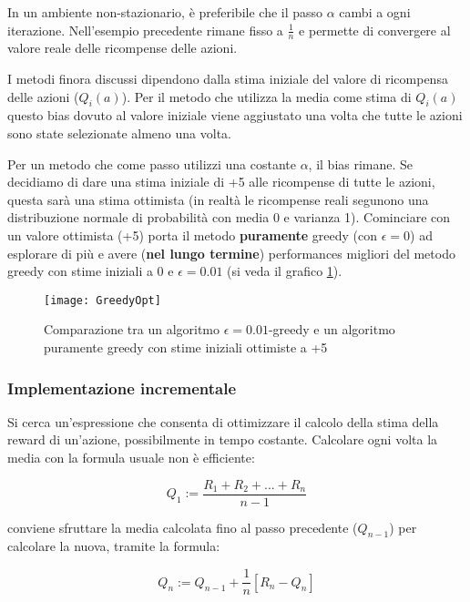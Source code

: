In un ambiente non-stazionario, è preferibile che il passo $\alpha$ cambi a ogni
iterazione. Nell'esempio precedente rimane fisso a $\frac{1}{n}$ e permette di convergere
al valore reale delle ricompense delle azioni.

I metodi finora discussi dipendono dalla stima iniziale del valore di
ricompensa delle azioni ($Q_i(a)$).
Per il metodo che utilizza la media come stima di $Q_i(a)$ questo bias
dovuto al valore iniziale viene aggiustato una volta che tutte le azioni
sono state selezionate almeno una volta.

Per un metodo che come passo utilizzi una costante $\alpha$, il bias rimane.
Se decidiamo di dare una stima iniziale di +5 alle ricompense di tutte le
azioni, questa sarà una stima ottimista (in realtà le ricompense reali
segunono una distribuzione normale di probabilità con media 0 e varianza 1).
Cominciare con un valore ottimista (+5) porta il metodo \textbf{puramente}
greedy (con $\epsilon = 0$) ad esplorare di più e avere (\textbf{nel lungo termine})
performances migliori del metodo greedy con stime iniziali a 0 e $\epsilon = 0.01$
(si veda il grafico \ref{fig:greedyOpt}).

\begin{figure}[H]
\centering
\texttt{[image: GreedyOpt]}
\caption{Comparazione tra un algoritmo $\epsilon = 0.01$-greedy e un algoritmo
puramente greedy con stime iniziali ottimiste a +5}
\label{fig:greedyOpt}
\end{figure}

\subsubsection{Implementazione incrementale}

Si cerca un'espressione che consenta di ottimizzare il calcolo della stima della reward di un'azione,
possibilmente in tempo costante.
Calcolare ogni volta la media con la formula usuale non è efficiente:

\begin{equation}
 Q_1 := \frac{R_1 + R_2 + ... + R_n}{n - 1}
\end{equation}

conviene sfruttare la media calcolata fino al passo precedente ($Q_{n-1}$) per calcolare la
nuova, tramite la formula:

\begin{equation}
 Q_n := Q_{n-1} + \frac{1}{n}[R_n - Q_n]
\end{equation}

